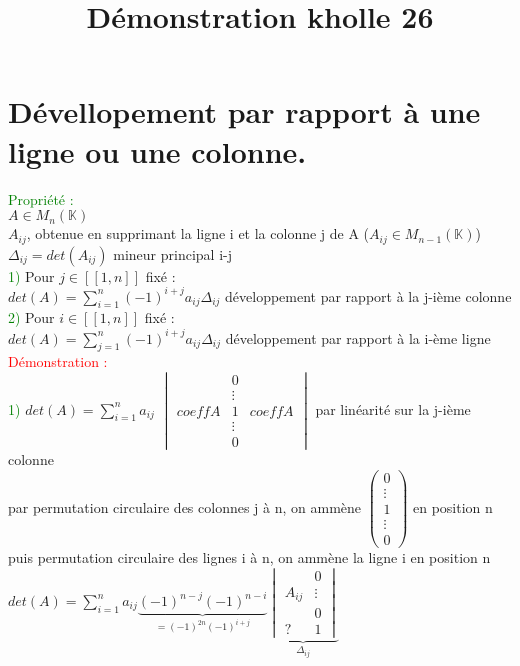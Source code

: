 \documentclass{article}
\begin{document}
\title{Démonstration kholle 26}
\date{}
\maketitle
\renewcommand{\thesection}{\Roman{section}}
\setlength{\parindent}{1.5cm}
\section{Dévellopement par rapport à une ligne ou une colonne.}
\textcolor{green}{Propriété :} \\
$A \in M_n(\mathbb K) $ \\
$A_{ij}$, obtenue en supprimant la ligne i et la colonne j de A ($A_{ij} \in M_{n-1}(\mathbb K)$) \\
$\Delta_{ij}=det(A_{ij})$ mineur principal i-j \\
\textcolor{green}{1)} Pour $j \in [[1,n]]$ fixé : \\
$det(A)=\sum_{i=1}^n (-1)^{i+j} a_{ij} \Delta_{ij}$ développement par rapport à la j-ième colonne \\
\textcolor{green}{2)} Pour $i \in [[1,n]]$ fixé : \\
$det(A)= \sum_{j=1}^n (-1)^{i+j} a_{ij} \Delta_{ij}$ développement par rapport à la i-ème ligne \\
\textcolor{red}{Démonstration :} \\
\textcolor{green}{1)} $det(A)=\sum_{i=1}^n a_{ij}$
$\begin{vmatrix} &0 & \\ & \vdots &\\
  coeffA & 1 & coeffA \\
  & \vdots & \\
  & 0 &
\end{vmatrix}$
par linéarité sur la j-ième colonne \\
par permutation circulaire des colonnes j à n, on ammène $\begin{pmatrix} 0 \\ \vdots \\ 1 \\ \vdots \\ 0\end{pmatrix}$ en position n \\
  puis permutation circulaire des lignes i à n, on ammène la ligne i en position n \\
  $det(A)= \sum_{i=1}^n a_{ij} \underbrace{(-1)^{n-j} (-1)^{n-i}}_{=(-1)^{2n}(-1)^{i+j}} \underbrace{\begin{vmatrix} & 0 \\
    A_{ij} & \vdots \\
    & 0 \\
    ? & 1\end{vmatrix}}_{\Delta_{ij}}$ \\
\end{document}
